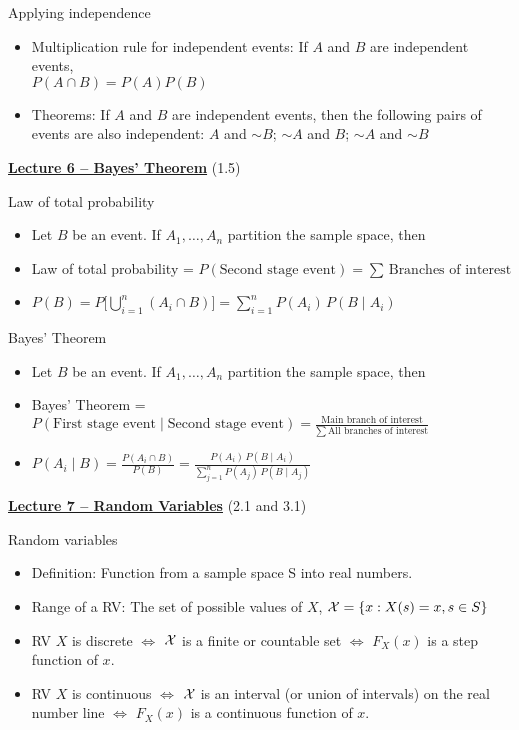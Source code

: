 \documentclass{article}
\newcommand{\bu}[1]{\textbf{\ul{#1}}}				%
\newcommand{\comp}{{\sim}}			%
\newcommand{\vecn}[2]{#1_1, \ldots, #1_{#2}}		%
\begin{document}
Applying independence
\begin{itemize}
    \item Multiplication rule for independent events: If $A$ and $B$ are independent events,\\$P(A \cap B) = P(A) P(B)$
    \item Theorems: If $A$ and $B$ are independent events, then the following pairs of events are also independent: $A$ and $\comp B$; $\comp A$ and $B$; $\comp A$ and $\comp B$
\end{itemize}    

\vspace{100pt}

{\large \bu{Lecture 6 -- Bayes' Theorem}} (1.5)\bigskip

Law of total probability
\begin{itemize}
    \item Let $B$ be an event. If $\vecn{A}{n}$ partition the sample space, then
    \item[] Law of total probability = $P(\text{Second stage event}) = \sum \, \text{Branches of interest}$
    \item[] $\displaystyle P(B) = P\big[\bigcup_{i = 1}^{n} (A_i \cap B)\big] = \sum_{i = 1}^{n} P(A_i) \, P(B \mid A_i)$
\end{itemize}\bigskip

Bayes' Theorem
\begin{itemize}
    \item Let $B$ be an event. If $\vecn{A}{n}$ partition the sample space, then
    \item[] Bayes' Theorem = $ P(\text{First stage event} \mid \text{Second stage event}) = \frac{\text{Main branch of interest}}{\sum \, \text{All branches of interest}}$
    \item[] $\displaystyle P(A_i \mid B) = \frac{P(A_i \cap B)}{P(B)} = \frac{P(A_i) \, P(B \mid A_i)}{\sum_{j = 1}^{n} P(A_j) \, P(B \mid A_j)}$
\end{itemize}

\vspace{60pt}

{\large \bu{Lecture 7 -- Random Variables}} (2.1 and 3.1)\bigskip

Random variables
\begin{itemize}
    \item Definition: Function from a sample space S into real numbers.
    \item Range of a RV: The set of possible values of $X$, ${\cal X} = \{x: X(s) = x, s \in S\}$
    \item RV $X$ is discrete $\Longleftrightarrow$ ${\cal X} $ is a finite or countable set $\Longleftrightarrow$ $F_X(x)$ is a step function of $x$.
    \item RV $X$ is continuous $\Longleftrightarrow$ ${\cal X} $ is an interval (or union of intervals) on the real number line $\Longleftrightarrow$ $F_X(x)$ is a continuous function of $x$.
\end{itemize}\vspace{40pt}
\end{document}
